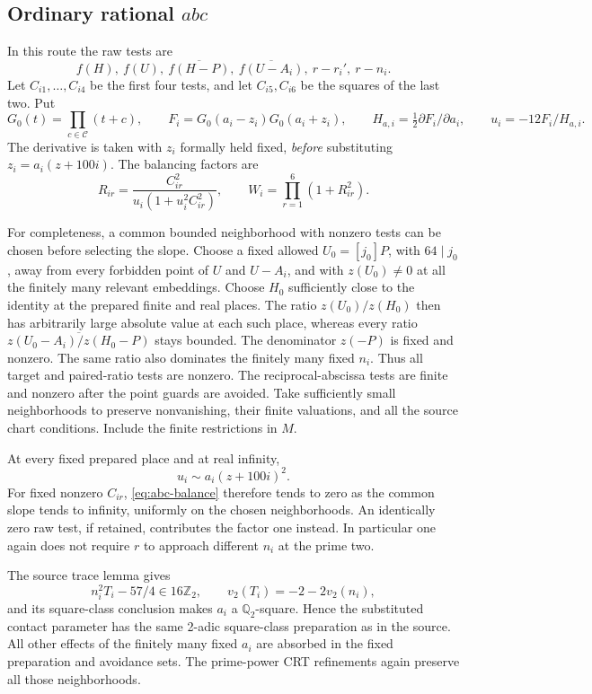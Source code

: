 \documentclass[11pt]{article}
\newcommand{\Q}{\mathbb Q}
\newcommand{\Z}{\mathbb Z}
\begin{document}
\subsection{Ordinary rational \(abc\)}

In this route the raw tests are
\[
 f(H),\ f(U),\ \overline{f(H-P)},\
 \overline{f(U-A_i)},\ r-r_i',\ r-n_i .
\]
Let \(C_{i1},\ldots,C_{i4}\) be the first four tests, and
let \(C_{i5},C_{i6}\) be the squares of the last two.
Put
\[
 G_0(t)=\prod_{c\in\mathcal C}(t+c),\qquad
 F_i=G_0(a_i-z_i)G_0(a_i+z_i),\qquad
 H_{a,i}=\tfrac12\partial F_i/\partial a_i,\qquad
 u_i=-12F_i/H_{a,i}.
\]
The derivative is taken with \(z_i\) formally held fixed,
\emph{before} substituting \(z_i=a_i(z+100i)\).
The balancing factors are
\begin{equation}\label{eq:abc-balance}
 R_{ir}=\frac{C_{ir}^2}{u_i(1+u_i^2C_{ir}^2)},\qquad
 W_i=\prod_{r=1}^{6}(1+R_{ir}^2).
\end{equation}

For completeness, a common bounded neighborhood with nonzero
tests can be chosen before selecting the slope. Choose a fixed
allowed \(U_0=[j_0]P\), with \(64\mid j_0\), away from every
forbidden point of \(U\) and \(U-A_i\), and with \(z(U_0)\ne0\)
at all the finitely many relevant embeddings. Choose \(H_0\)
sufficiently close to the identity at the prepared finite and
real places. The ratio \(z(U_0)/z(H_0)\) then has arbitrarily
large absolute value at each such place, whereas every ratio
\(\overline{z(U_0-A_i)/z(H_0-P)}\) stays bounded. The
denominator \(z(-P)\) is fixed and nonzero. The same ratio
also dominates the finitely many fixed \(n_i\). Thus all target
and paired-ratio tests are nonzero. The reciprocal-abscissa
tests are finite and nonzero after the point guards are avoided.
Take sufficiently small neighborhoods to preserve nonvanishing,
their finite valuations, and all the source chart conditions.
Include the finite restrictions in \(M\).

At every fixed prepared place and at real infinity,
\[
                    u_i\sim a_i(z+100i)^2 .
\]
For fixed nonzero \(C_{ir}\), \eqref{eq:abc-balance} therefore
tends to zero as the common slope tends to infinity, uniformly
on the chosen neighborhoods. An identically zero raw test,
if retained, contributes the factor one instead. In particular
one again does not require \(r\) to approach different \(n_i\)
at the prime two.

The source trace lemma gives
\[
 n_i^2T_i-57/4\in16\Z_2,\qquad
 v_2(T_i)=-2-2v_2(n_i),
\]
and its square-class conclusion makes \(a_i\) a
\(\Q_2\)-square. Hence the substituted contact parameter has
the same 2-adic square-class preparation as in the source.
All other effects of the finitely many fixed \(a_i\) are
absorbed in the fixed preparation and avoidance sets.
The prime-power CRT refinements again preserve all those
neighborhoods.
\end{document}
